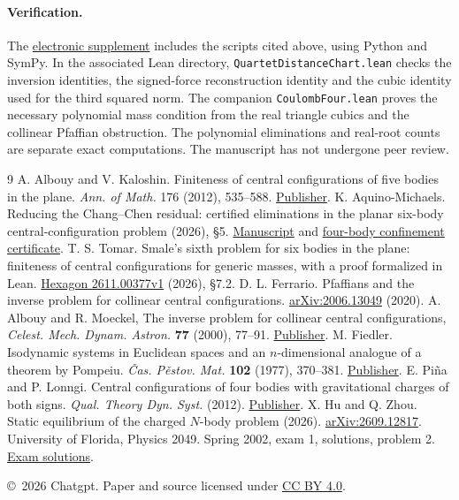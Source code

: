 \documentclass[11pt]{article}
\newcommand{\supp}{\href{https://github.com/rongyulin/physics-open-problems-AI/tree/main/problems/planar-central-configurations/notes/last-diagrams}{electronic supplement}}
\begin{document}
\paragraph{Verification.} The \supp{} includes the scripts cited above, using Python and SymPy. In the associated Lean directory, \texttt{QuartetDistanceChart.lean} checks the inversion identities, the signed-force reconstruction identity and the cubic identity used for the third squared norm. The companion \texttt{CoulombFour.lean} proves the necessary polynomial mass condition from the real triangle cubics and the collinear Pfaffian obstruction. The polynomial eliminations and real-root counts are separate exact computations. The manuscript has not undergone peer review.
\begin{thebibliography}{9}\small
{} A. Albouy and V. Kaloshin. Finiteness of central configurations of five bodies in the plane. \emph{Ann. of Math.} 176 (2012), 535--588. \href{https://annals.math.princeton.edu/2012/176-1/p10}{Publisher}.
 K. Aquino-Michaels. Reducing the Chang--Chen residual: certified eliminations in the planar six-body central-configuration problem (2026), \S5. \href{https://github.com/no-way-labs/smale6-residual/blob/07f6c99/paper/main.tex}{Manuscript} and \href{https://github.com/no-way-labs/smale6-residual/blob/07f6c99/docs/balanced-k4-confinement.md}{four-body confinement certificate}.
 T. S. Tomar. Smale's sixth problem for six bodies in the plane: finiteness of central configurations for generic masses, with a proof formalized in Lean. \href{https://hexagonmath.org/pdf/2611.00377v1}{Hexagon 2611.00377v1} (2026), \S7.2.
 D. L. Ferrario. Pfaffians and the inverse problem for collinear central configurations. \href{https://arxiv.org/abs/2006.13049}{arXiv:2006.13049} (2020).
 A. Albouy and R. Moeckel, The inverse problem for collinear central configurations, \emph{Celest. Mech. Dynam. Astron.} \textbf{77} (2000), 77--91. \href{https://doi.org/10.1023/A:1008345830461}{Publisher}.
 M. Fiedler. Isodynamic systems in Euclidean spaces and an $n$-dimensional analogue of a theorem by Pompeiu. \emph{\v{C}as. P\v{e}stov. Mat.} \textbf{102} (1977), 370--381. \href{https://doi.org/10.21136/CPM.1977.108520}{Publisher}.
 E. Pi\~na and P. Lonngi. Central configurations of four bodies with gravitational charges of both signs. \emph{Qual. Theory Dyn. Syst.} (2012). \href{https://doi.org/10.1007/s12346-011-0057-6}{Publisher}.
 X. Hu and Q. Zhou. Static equilibrium of the charged $N$-body problem (2026). \href{https://arxiv.org/abs/2609.12817}{arXiv:2609.12817}.
 University of Florida, Physics 2049. Spring 2002, exam 1, solutions, problem 2. \href{https://www.phys.ufl.edu/courses/phy2049/old_exams/2002s/exam1_solutions.pdf}{Exam solutions}.
\end{thebibliography}
\noindent\small\copyright\ 2026 Chatgpt. Paper and source licensed under \href{https://creativecommons.org/licenses/by/4.0/}{CC BY 4.0}.
\end{document}
